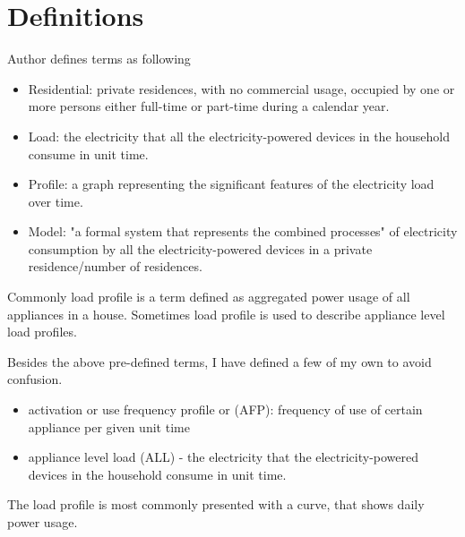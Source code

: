 \documentclass[
11pt, %
english, %
singlespacing, %
headsepline, %
]{MastersDoctoralThesis} %
\begin{document}
\chapter{Definitions}

Author \cite{Review2021} defines terms as following

\begin{itemize}
	\item Residential: private residences, with no commercial usage, occupied by one or more persons either full-time or part-time during a calendar year.
	\item Load: the electricity that all the electricity-powered devices in the household consume in unit time.
	\item Profile: a graph representing the significant features of the electricity load over time.
	\item Model: "a formal system that represents the combined processes" \cite{KAVOUSIAN2013184} of electricity consumption by all the electricity-powered devices in a private residence/number of residences.
\end{itemize}

Commonly load profile is a term defined as aggregated power usage of all appliances in a house. 
Sometimes load profile is used to describe appliance level load profiles. 

Besides the above pre-defined terms, I have defined a few of my own to avoid confusion.
\begin{itemize}
	\item activation or use frequency profile or (AFP): frequency of use of certain appliance per given unit time
	\item appliance level load (ALL) - the electricity that the electricity-powered devices in the household consume in unit time.
\end{itemize}

The load profile is most commonly presented with a curve, that shows daily power usage.
\end{document}

